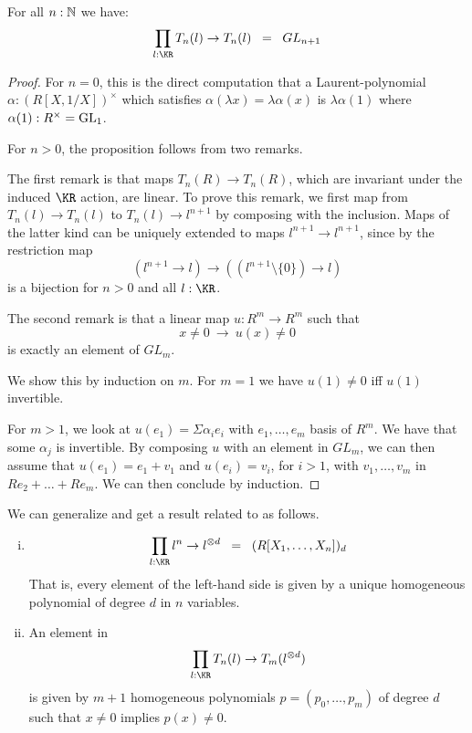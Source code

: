 \begin{proposition}\label{aut}
  For all $n:\mathbb{N}$ we have:
$$\prod_{l:\KR}T_n(l)\rightarrow T_n(l) \;\;=\;\; GL_{n+1}$$
\end{proposition}

\begin{proof}
  For $n=0$, this is the direct computation that a Laurent-polynomial $\alpha:(R[X,1/X])^\times$ which satisfies
  $\alpha(\lambda x)=\lambda \alpha(x)$ is $\lambda\alpha(1)$ where $\alpha(1):R^\times=\operatorname{GL}_1$.
  
  \medskip
  
  For $n>0$, the proposition follows from two remarks.

  The first remark is that maps $T_n(R)\to T_n(R)$, which are invariant under the induced $\KR$ action, are linear.
  To prove this remark, we first map from $T_n(l)\to T_n(l)$ to $T_n(l)\to l^{n+1}$ by composing with the inclusion.
  Maps of the latter kind can be uniquely extended to maps $l^{n+1}\to l^{n+1}$, since by 
   the restriction map
$$
(l^{n+1}\rightarrow l)\rightarrow ((l^{n+1}\setminus\{0\})\rightarrow l)
$$
is a bijection for $n>0$ and all $l:\KR$.

\medskip

The second remark is that a linear map $u:R^{m}\rightarrow R^{m}$ such that
$$
x\neq 0~\rightarrow~u(x)\neq 0
$$
is exactly an element of $GL_{m}$.

We show this by induction on $m$. For $m=1$ we have $u(1)\neq 0$ iff $u(1)$ invertible.

For $m>1$, we look at $u(e_1) = \Sigma \alpha_ie_i$ with $e_1,\dots,e_m$ basis of $R^m$.
We have that some $\alpha_j$ is invertible.
By composing $u$ with an element in $GL_m$, we can then
assume that $u(e_1) = e_1+v_1$ and $u(e_i) = v_i$, for $i>1$, with $v_1,\dots,v_m$ in $Re_2+\dots+Re_m$.
We can then conclude by induction.
\end{proof}

We can generalize 
and get a result related to  as follows.
 
\begin{lemma}\label{hom}
  \begin{enumerate}[(i)]
    \item
      \[  \prod_{l:\KR}l^n\rightarrow l^{\otimes d} \;\;=\;\; (R[X_1, \dots, X_n])_d \]
      That is,
      every element of the left-hand side is given by
      a unique homogeneous polynomial of degree $d$ in $n$ variables.
    \item
      An element in
      $$\prod_{l:\KR}T_n(l)\rightarrow T_m(l^{\otimes d})$$
      is given by $m+1$ homogeneous polynomials $p = (p_0,\dots,p_m)$ of degree $d$ such that
      $x\neq 0$ implies $p(x)\neq 0$.
  \end{enumerate}
\end{lemma}

